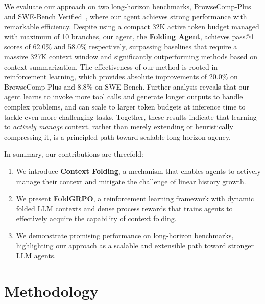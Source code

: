 We evaluate our approach on two long-horizon benchmarks, BrowseComp-Plus~\citep{Chen2025BrowseCompPlusAM} and SWE-Bench Verified~\citep{Jimenez2023SWEbenchCL}, where our agent achieves strong performance with remarkable efficiency. 
Despite using a compact 32K active token budget managed with maximum of 10 branches, our agent, the \textbf{Folding Agent}, achieves pass@1 scores of 62.0\% and 58.0\% respectively, surpassing baselines that require a massive 327K context window and significantly outperforming methods based on context summarization. 
The effectiveness of our method is rooted in reinforcement learning, which provides absolute improvements of 20.0\% on BrowseComp-Plus and 8.8\% on SWE-Bench. 
Further analysis reveals that our agent learns to invoke more tool calls and generate longer outputs to handle complex problems, and can scale to larger token budgets at inference time to tackle even more challenging tasks. 
Together, these results indicate that learning to \textit{actively manage} context, rather than merely extending or heuristically compressing it, is a principled path toward scalable long-horizon agency.

In summary, our contributions are threefold: 
\begin{enumerate}[label=(\roman*),leftmargin=20pt]
\item We introduce \textbf{Context Folding}, a mechanism that enables agents to actively manage their context and mitigate the challenge of linear history growth.
\item We present \textbf{FoldGRPO}, a reinforcement learning framework with dynamic folded LLM contexts and dense process rewards that trains agents to effectively acquire the capability of context folding.
\item We demonstrate promising performance on long-horizon benchmarks, highlighting our approach as a scalable and extensible path toward stronger LLM agents.
\end{enumerate}



\section{Methodology}

